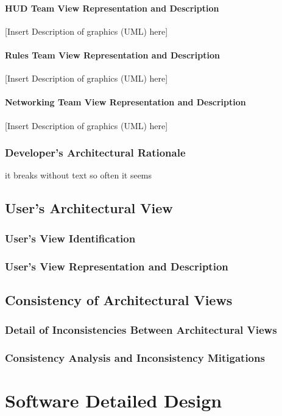 \documentclass[12pt,a4paper]{article}
\begin{document}
\paragraph{HUD Team View Representation and Description}
[Insert Description of graphics (UML) here] 
\paragraph{Rules Team View Representation and Description}
[Insert Description of graphics (UML) here]
\paragraph{Networking Team View Representation and Description}
[Insert Description of graphics (UML) here]
\subsubsection{Developer's Architectural Rationale} it breaks without text so often it seems

\subsection{User's Architectural View}
	\subsubsection{User's View Identification}
	\subsubsection{User's View Representation and Description}
\subsection{Consistency of Architectural Views}
	\subsubsection{Detail of Inconsistencies Between Architectural Views}
	\subsubsection{Consistency Analysis and Inconsistency Mitigations}

\section{Software Detailed Design}
\end{document}
